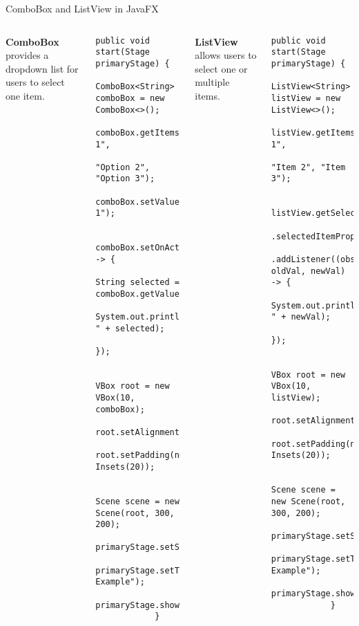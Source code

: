 \documentclass[aspectratio=169, table]{beamer}
\begin{document}
\begin{frame}[fragile]{ComboBox and ListView in JavaFX}
	\vspace{10pt}
	\begin{columns}[t]
		\textbf{ComboBox} provides a dropdown list for users to select one item.
		\begin{lstlisting}[style=JavaStyle]
			public void start(Stage primaryStage) {
				ComboBox<String> comboBox = new ComboBox<>();
				comboBox.getItems().addAll("Option 1", 
				"Option 2", "Option 3");
				comboBox.setValue("Option 1");
				
				comboBox.setOnAction(e -> {
					String selected = comboBox.getValue();
					System.out.println("Selected: " + selected);
				});
				
				VBox root = new VBox(10, comboBox);
				root.setAlignment(Pos.CENTER);
				root.setPadding(new Insets(20));
				
				Scene scene = new Scene(root, 300, 200);
				primaryStage.setScene(scene);
				primaryStage.setTitle("ComboBox Example");
				primaryStage.show();
			}
		\end{lstlisting}
		
		\textbf{ListView} allows users to select one or multiple items.
		\begin{lstlisting}[style=JavaStyle]
			public void start(Stage primaryStage) {
				ListView<String> listView = new ListView<>();
				listView.getItems().addAll("Item 1", 
				"Item 2", "Item 3");
				
				listView.getSelectionModel()
				.selectedItemProperty()
				.addListener((obs, oldVal, newVal) -> {
					System.out.println("Selected: " + newVal);
				});
				
				VBox root = new VBox(10, listView);
				root.setAlignment(Pos.CENTER);
				root.setPadding(new Insets(20));
				
				Scene scene = new Scene(root, 300, 200);
				primaryStage.setScene(scene);
				primaryStage.setTitle("ListView Example");
				primaryStage.show();
			}
		\end{lstlisting}
	\end{columns}
\end{frame}
\end{document}
